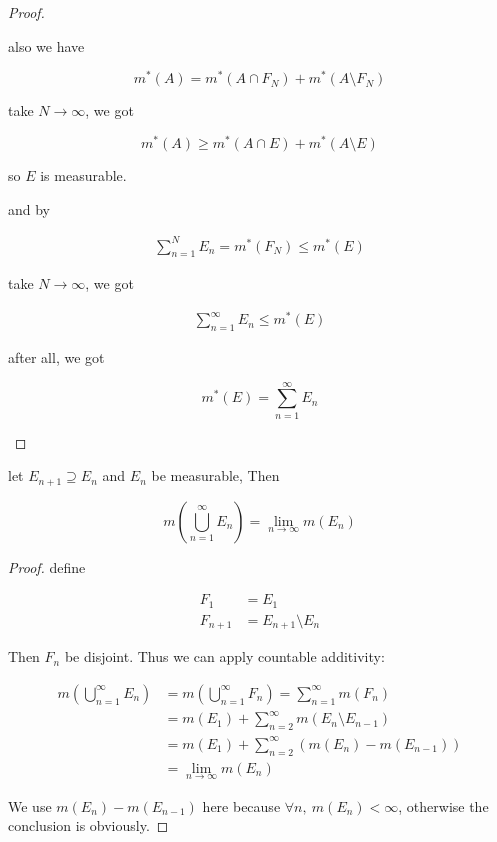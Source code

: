 \begin{proof}
\begin{enumerate}
    also we have

    \[
        m^*(A) = m^*(A \cap F_N) + m^*(A \setminus F_N)
    \]

    take $N \to \infty$, we got

    \[
        m^*(A) \ge m^*(A \cap E) + m^*(A \setminus E)
    \]

    so $E$ is measurable.

    and by

    \begin{align*}
        \sum_{n=1}^{N}E_n = m^*(F_N) \le m^*(E)
    \end{align*}

    take $N \to \infty$, we got

    \begin{align*}
        \sum_{n=1}^{\infty}E_n  \le m^*(E)
    \end{align*}

    after all, we got

    \[
        m^*(E) = \sum_{n=1}^{\infty}E_n
    \]

    \end{enumerate}  
\end{proof}

\begin{thm}
    let $E_{n+1} \supseteq E_{n}$ and $E_n$ be measurable, Then 

    \[
        m\left(\bigcup_{n=1}^{\infty}E_n \right) = \lim_{n \to \infty}m(E_n)
    \]
\end{thm}

\begin{proof}
    define 

    \begin{align*}
        F_1 &= E_1 \\
        F_{n+1} &= E_{n+1} \setminus E_{n}
    \end{align*}

    Then $F_n$ be disjoint. Thus we can apply countable additivity:

    \begin{align*}
       m\left(\bigcup_{n=1}^{\infty}E_n\right) &= m\left(\bigcup_{n=1}^{\infty}F_n\right) = \sum_{n=1}^{\infty}m(F_n) \\
       &= m(E_1) + \sum_{n=2}^{\infty}m(E_{n} \setminus E_{n-1}) \\
       &= m(E_1) + \sum_{n=2}^{\infty}\left(m(E_{n}) - m(E_{n-1}) \right)\\
       &= \lim_{n \to \infty}m(E_n)
    \end{align*}

    We use $m(E_{n}) - m(E_{n-1})$ here because  $\forall n, \:m(E_n) < \infty$, otherwise the conclusion is obviously.
\end{proof}

